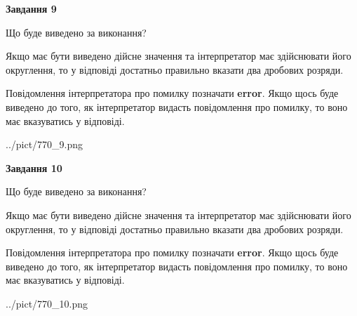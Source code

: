 \documentclass[12pt, ukrainian]{article}
\begin{document}
{\begin {Large}
{\begin {center}\textbf{Завдання 9}\end {center}}\par
Що буде виведено за виконання? \par

Якщо має бути виведено дійсне значення та інтерпретатор має здійснювати його округлення, 
то у відповіді достатньо правильно вказати два дробових розряди.

Повідомлення інтерпретатора про помилку позначати \textbf{error}.
Якщо щось буде виведено до того, як інтерпретатор видасть повідомлення про помилку, 
то воно має вказуватись у відповіді. \par

\begin{center}
	{../pict/770_9.png}
\end{center}
\newpage

{\begin {center}\textbf{Завдання 10}\end {center}}\par
Що буде виведено за виконання? \par

Якщо має бути виведено дійсне значення та інтерпретатор має здійснювати його округлення, 
то у відповіді достатньо правильно вказати два дробових розряди.

Повідомлення інтерпретатора про помилку позначати \textbf{error}.
Якщо щось буде виведено до того, як інтерпретатор видасть повідомлення про помилку, 
то воно має вказуватись у відповіді. \par

\begin{center}
	{../pict/770_10.png}
\end{center}
\newpage

\end {Large}}
\end{document}
